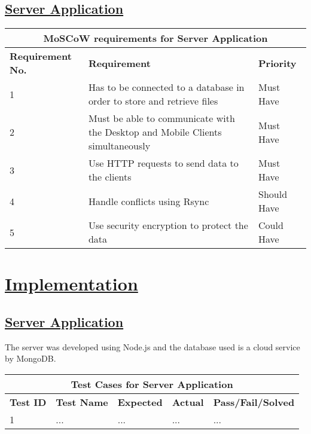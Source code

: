\documentclass{article}
\begin{document}
\subsection{\underline{Server Application}}

\begin{tabular}{|p{3cm}|p{5cm}|p{4cm}|}
\hline
\multicolumn{3}{|c|}{\textbf{MoSCoW requirements for Server Application}} \\
\hline
\textbf{Requirement No.} & \textbf{Requirement} & \textbf{Priority}\\
\hline
1 & Has to be connected to a database in order to store and retrieve files & Must Have \\
\hline
2 & Must be able to communicate with the Desktop and Mobile Clients simultaneously & Must Have \\
\hline
3 & Use HTTP requests to send data to the clients & Must Have \\
\hline
4 & Handle conflicts using Rsync & Should Have \\
\hline
5 & Use security encryption to protect the data & Could Have\\
\hline
\end{tabular}

\section{\underline{Implementation}}
\subsection{\underline{Server Application}}
The server was developed using Node.js and the database used is a cloud service by MongoDB.

\begin{tabular}{|p{2cm}|p{2cm}|p{3cm}|p{3cm}|p{3cm}|}
\hline
\multicolumn{5}{|c|}{\textbf{Test Cases for Server Application}} \\
\hline
\textbf{Test ID} & \textbf{Test Name} & \textbf{Expected} & \textbf{Actual} & \textbf{Pass/Fail/Solved} \\
\hline
1 & ... & ... & ... & ... \\
\hline
\end{tabular}
\end{document}
